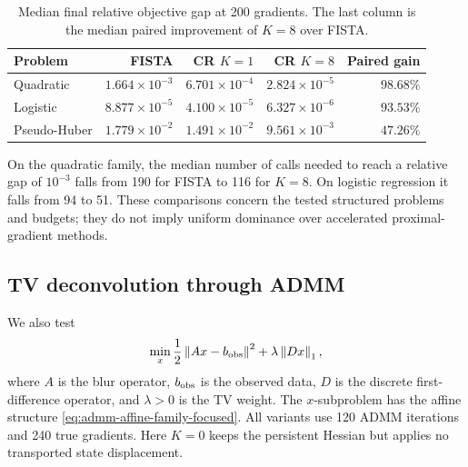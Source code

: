 \documentclass[10pt,leqno]{amsart}
\numberwithin{equation}{section}
\numberwithin{algorithm}{section}
\theoremstyle{remark}
\newcommand{\norm}[1]{\left\lVert #1 \right\rVert}
\begin{document}
\begin{table}[t]
\centering
\caption{Median final relative objective gap at 200 gradients.  The last column is the median paired improvement of $K=8$ over FISTA.}
\label{tab:focused-fista}
\scriptsize
\begin{tabular}{@{}lrrrr@{}}
\toprule
Problem & FISTA & CR $K=1$ & CR $K=8$ & Paired gain\\
\midrule
Quadratic & $1.664\!\times\!10^{-3}$ & $6.701\!\times\!10^{-4}$ & $2.824\!\times\!10^{-5}$ & $98.68\%$\\
Logistic & $8.877\!\times\!10^{-5}$ & $4.100\!\times\!10^{-5}$ & $6.327\!\times\!10^{-6}$ & $93.53\%$\\
Pseudo-Huber & $1.779\!\times\!10^{-2}$ & $1.491\!\times\!10^{-2}$ & $9.561\!\times\!10^{-3}$ & $47.26\%$\\
\bottomrule
\end{tabular}
\end{table}

On the quadratic family, the median number of calls needed to reach a relative gap of $10^{-3}$ falls from 190 for FISTA to 116 for $K=8$.  On logistic regression it falls from 94 to 51.  These comparisons concern the tested structured problems and budgets; they do not imply uniform dominance over accelerated proximal-gradient methods.

\subsection{TV deconvolution through ADMM}

We also test
\begin{equation}
\label{eq:tv-problem-focused}
    \min_x \frac12\norm{Ax-b_{\rm obs}}^2+\lambda\norm{Dx}_1,
\end{equation}
where $A$ is the blur operator, $b_{\rm obs}$ is the observed data, $D$ is the discrete first-difference operator, and $\lambda>0$ is the TV weight.  The $x$-subproblem has the affine structure \eqref{eq:admm-affine-family-focused}.  All variants use 120 ADMM iterations and 240 true gradients.  Here $K=0$ keeps the persistent Hessian but applies no transported state displacement.
\end{document}
